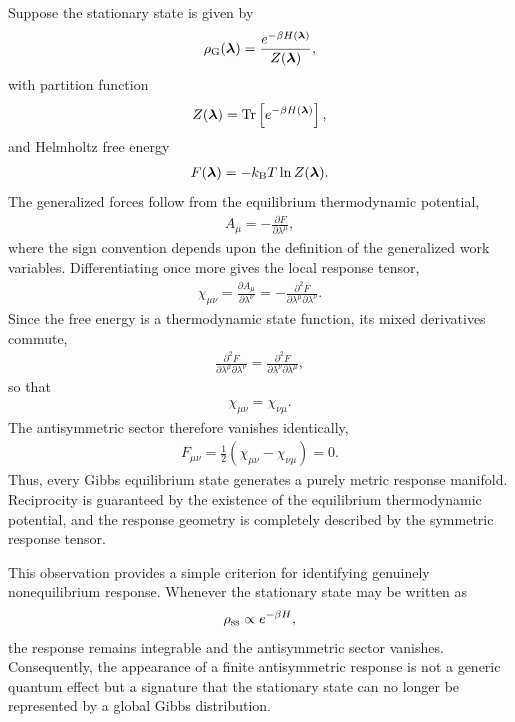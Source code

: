 Suppose the stationary state is given by
\begin{align}
\rho_{\rm G}(\bm{\lambda})
=
\frac{e^{-\beta H(\bm{\lambda})}}
{Z(\bm{\lambda})},
\end{align}
with partition function
\begin{align}
Z(\bm{\lambda})
=
{\rm Tr}
\left[
e^{-\beta H(\bm{\lambda})}
\right],
\end{align}
and Helmholtz free energy
\begin{align}
F(\bm{\lambda})
=
-k_{\rm B}T
\ln Z(\bm{\lambda}).
\end{align}
The generalized forces follow from the equilibrium
thermodynamic potential,
\begin{align}
A_\mu
=
-\frac{\partial F}
{\partial\lambda^\mu},
\end{align}
where the sign convention depends upon the definition of
the generalized work variables. Differentiating once more
gives the local response tensor,
\begin{align}
\chi_{\mu\nu}
=
\frac{\partial A_\mu}
{\partial\lambda^\nu}
=
-
\frac{\partial^2F}
{\partial\lambda^\mu
 \partial\lambda^\nu}.
\end{align}
Since the free energy is a thermodynamic state function,
its mixed derivatives commute,
\begin{align}
\frac{\partial^2F}
{\partial\lambda^\mu
 \partial\lambda^\nu}
=
\frac{\partial^2F}
{\partial\lambda^\nu
 \partial\lambda^\mu},
\end{align}
so that
\begin{align}
\chi_{\mu\nu}
=
\chi_{\nu\mu}.
\end{align}
The antisymmetric sector therefore vanishes identically,
\begin{align}
F_{\mu\nu}
=
\frac12
\left(
\chi_{\mu\nu}
-
\chi_{\nu\mu}
\right)
=
0.
\end{align}
Thus, every Gibbs equilibrium state generates a purely
metric response manifold. Reciprocity is guaranteed by
the existence of the equilibrium thermodynamic
potential, and the response geometry is completely
described by the symmetric response tensor.

This observation provides a simple criterion for
identifying genuinely nonequilibrium response.
Whenever the stationary state may be written as
\begin{align}
\rho_{\rm ss}
\propto
e^{-\beta H},
\end{align}
the response remains integrable and the antisymmetric
sector vanishes. Consequently, the appearance of a
finite antisymmetric response is not a generic quantum
effect but a signature that the stationary state can no
longer be represented by a global Gibbs distribution.

